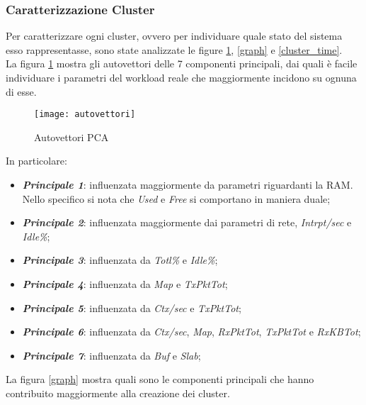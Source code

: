 \clearpage

\subsubsection{Caratterizzazione Cluster}
Per caratterizzare ogni cluster, ovvero per individuare quale stato del sistema
esso rappresentasse, sono state analizzate le figure \ref{autovettori}, \ref{graph}
e \ref{cluster_time}.\\
La figura \ref{autovettori} mostra gli autovettori delle 7 componenti principali,
dai quali è facile individuare i parametri del workload reale che maggiormente
incidono su ognuna di esse.\\
\begin{figure}[!htbp]
  \centering
  \texttt{[image: autovettori]}
  \caption{Autovettori PCA}
  \label{autovettori}
\end{figure}

In particolare:

\begin{itemize}
  \item \textbf{\textit{Principale 1}}: influenzata maggiormente da parametri
  riguardanti la RAM.\\
  Nello specifico si nota che \textit{Used} e \textit{Free} si comportano in maniera duale;
  \item \textbf{\textit{Principale 2}}: influenzata maggiormente dai parametri
  di rete, \textit{Intrpt/sec} e \textit{Idle\%};
  \item \textbf{\textit{Principale 3}}: influenzata da \textit{Totl\%} e \textit{Idle\%};
  \item \textbf{\textit{Principale 4}}: influenzata da \textit{Map} e \textit{TxPktTot};
  \item \textbf{\textit{Principale 5}}: influenzata da \textit{Ctx/sec} e \textit{TxPktTot};
  \item \textbf{\textit{Principale 6}}: influenzata da \textit{Ctx/sec}, \textit{Map},
  \textit{RxPktTot}, \textit{TxPktTot} e \textit{RxKBTot};
  \item \textbf{\textit{Principale 7}}: influenzata da \textit{Buf} e \textit{Slab};
\end{itemize}

\clearpage

La figura \ref{graph} mostra quali sono le componenti principali che hanno contribuito
maggiormente alla creazione dei cluster.\\

